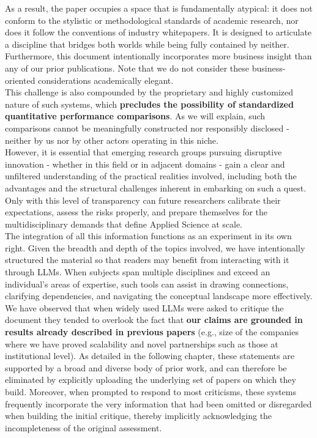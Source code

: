 \documentclass{article}
\begin{document}
As a result, the paper occupies a space that is fundamentally atypical: it does not conform to the stylistic or methodological standards of academic research, nor does it follow the conventions of industry whitepapers. It is designed to articulate a discipline that bridges both worlds while being fully contained by neither.\\

Furthermore, this document intentionally incorporates more business insight than any of our prior publications. Note that we do not consider these business-oriented considerations academically elegant.\\

This challenge is also compounded by the proprietary and highly customized nature of such systems, which \textbf{precludes the possibility of standardized quantitative performance comparisons}. As we will explain, such comparisons cannot be meaningfully constructed nor responsibly disclosed - neither by us nor by other actors operating in this niche.\\

However, it is essential that emerging research groups pursuing disruptive innovation - whether in this field or in adjacent domains - gain a clear and unfiltered understanding of the practical realities involved, including both the advantages and the structural challenges inherent in embarking on such a quest. Only with this level of transparency can future researchers calibrate their expectations, assess the risks properly, and prepare themselves for the multidisciplinary demands that define Applied Science at scale.\\

The integration of all this information functions as an experiment in its own right. Given the breadth and depth of the topics involved, we have intentionally structured the material so that readers may benefit from interacting with it through LLMs. When subjects span multiple disciplines and exceed an individual’s areas of expertise, such tools can assist in drawing connections, clarifying dependencies, and navigating the conceptual landscape more effectively. We have observed that when widely used LLMs were asked to critique the document they tended to overlook the fact that \textbf{our claims are grounded in results already described in previous papers} (e.g., size of the companies where we have proved scalability and novel partnerships such as those at institutional level). As detailed in the following chapter, these statements are supported by a broad and diverse body of prior work, and can therefore be eliminated by explicitly uploading the underlying set of papers on which they build. Moreover, when prompted to respond to most criticisms, these systems frequently incorporate the very information that had been omitted or disregarded when building the initial critique, thereby implicitly acknowledging the incompleteness of the original assessment.\\
\end{document}
